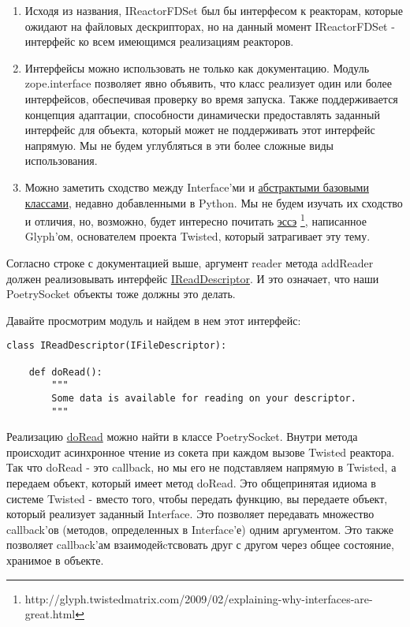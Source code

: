\begin{enumerate}

\item Исходя из названия, IReactorFDSet был бы интерфесом к реакторам, 
которые ожидают на файловых дескрипторах, но на данный момент IReactorFDSet - 
интерфейс ко всем имеющимся реализациям реакторов. 

\item Интерфейсы можно использовать не только как документацию. 
Модуль zope.interface позволяет явно объявить, что класс 
реализует один или более интерфейсов, обеспечивая проверку 
во время запуска. Также поддерживается концепция адаптации, 
способности динамически предоставлять заданный интерфейс для 
объекта, который может не поддерживать этот интерфейс напрямую. 
Мы не будем углубляться в эти более сложные виды использования.

\item Можно заметить сходство между Interface'ми и 
\href{http://www.python.org/dev/peps/pep-3119/}{абстрактыми базовыми 
классами}, недавно добавленными в Python. Мы не будем изучать 
их сходство и отличия, но, возможно, будет интересно почитать 
\href{http://glyph.twistedmatrix.com/2009/02/explaining-why-interfaces-are-great.html}{эссэ}
\footnote{http://glyph.twistedmatrix.com/2009/02/explaining-why-interfaces-are-great.html}, 
написанное Glyph'ом, основателем проекта Twisted, который 
затрагивает эту тему.

\end{enumerate}


Согласно строке с документацией выше, аргумент reader метода 
addReader должен реализовывать интерфейс 
\href{http://twistedmatrix.com/trac/browser/tags/releases/twisted-8.2.0/twisted/internet/interfaces.py#L947}{IReadDescriptor}. И это 
означает, что наши PoetrySocket объекты тоже должны это делать.


Давайте просмотрим модуль и найдем в нем этот интерфейс:

 \begin{verbatim}
class IReadDescriptor(IFileDescriptor):

    def doRead():
        """
        Some data is available for reading on your descriptor.
        """
\end{verbatim} 


Реализацию 
\href{http://github.com/jdavisp3/twisted-intro/blob/master/twisted-client-1/get-poetry.py#L88}{doRead} 
можно найти в классе PoetrySocket. 
Внутри метода происходит асинхронное чтение из сокета при каждом 
вызове Twisted реактора. Так что doRead - это callback, 
но мы его не подставляем напрямую в Twisted, а передаем 
объект, который имеет метод doRead. Это общепринятая идиома в системе 
Twisted - вместо того, чтобы передать функцию, вы передаете 
объект, который реализует заданный Interface. Это позволяет передавать 
множество callback'ов (методов, определенных в Interface'е) одним 
аргументом. Это также позволяет callback'ам взаимодейcтсвовать 
друг с другом через общее состояние, хранимое в объекте.


